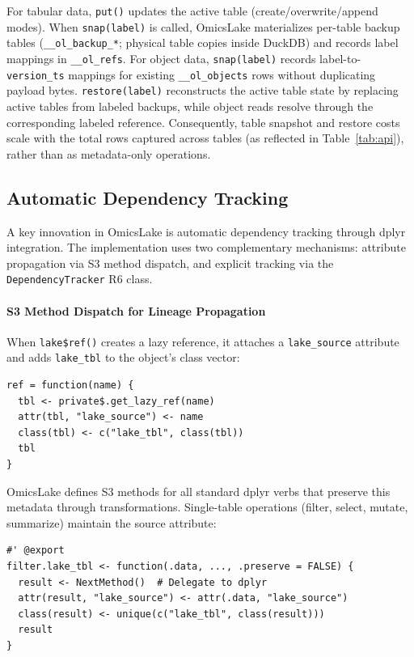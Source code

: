 \documentclass[11pt,a4paper]{article}
\begin{document}
For tabular data, \texttt{put()} updates the active table (create/overwrite/append modes). When \texttt{snap(label)} is called, OmicsLake materializes per-table backup tables (\texttt{\_\_ol\_backup\_*}; physical table copies inside DuckDB) and records label mappings in \texttt{\_\_ol\_refs}. For object data, \texttt{snap(label)} records label-to-\texttt{version\_ts} mappings for existing \texttt{\_\_ol\_objects} rows without duplicating payload bytes. \texttt{restore(label)} reconstructs the active table state by replacing active tables from labeled backups, while object reads resolve through the corresponding labeled reference. Consequently, table snapshot and restore costs scale with the total rows captured across tables (as reflected in Table~\ref{tab:api}), rather than as metadata-only operations.

\subsection{Automatic Dependency Tracking}

A key innovation in OmicsLake is automatic dependency tracking through dplyr integration. The implementation uses two complementary mechanisms: attribute propagation via S3 method dispatch, and explicit tracking via the \texttt{DependencyTracker} R6 class.

\paragraph{S3 Method Dispatch for Lineage Propagation}
When \texttt{lake\$ref()} creates a lazy reference, it attaches a \texttt{lake\_source} attribute and adds \texttt{lake\_tbl} to the object's class vector:

\begin{lstlisting}[caption={Creating tracked references}]
ref = function(name) {
  tbl <- private$.get_lazy_ref(name)
  attr(tbl, "lake_source") <- name
  class(tbl) <- c("lake_tbl", class(tbl))
  tbl
}
\end{lstlisting}

OmicsLake defines S3 methods for all standard dplyr verbs that preserve this metadata through transformations. Single-table operations (filter, select, mutate, summarize) maintain the source attribute:

\begin{lstlisting}[caption={S3 method preserving lineage through filter()}]
#' @export
filter.lake_tbl <- function(.data, ..., .preserve = FALSE) {
  result <- NextMethod()  # Delegate to dplyr
  attr(result, "lake_source") <- attr(.data, "lake_source")
  class(result) <- unique(c("lake_tbl", class(result)))
  result
}
\end{lstlisting}
\end{document}
